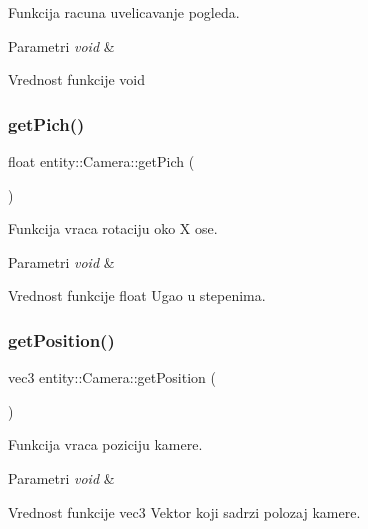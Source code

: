 Funkcija racuna uvelicavanje pogleda. 


\begin{DoxyParams}{Parametri}
{\em void} & \\
\hline
\end{DoxyParams}
\begin{DoxyReturn}{Vrednost funkcije}
void 
\end{DoxyReturn}
\mbox{\label{classentity_1_1Camera_a502da7b4da0782356f7bf75e99e4419c}} 
\subsubsection{\texorpdfstring{get\+Pich()}{getPich()}}
{\footnotesize\ttfamily float entity\+::\+Camera\+::get\+Pich (\begin{DoxyParamCaption}{ }\end{DoxyParamCaption})}



Funkcija vraca rotaciju oko X ose. 


\begin{DoxyParams}{Parametri}
{\em void} & \\
\hline
\end{DoxyParams}
\begin{DoxyReturn}{Vrednost funkcije}
float Ugao u stepenima. 
\end{DoxyReturn}
\mbox{\label{classentity_1_1Camera_a2c6b67d27b4012631306c2c2c5a3691c}} 
\subsubsection{\texorpdfstring{get\+Position()}{getPosition()}}
{\footnotesize\ttfamily vec3 entity\+::\+Camera\+::get\+Position (\begin{DoxyParamCaption}{ }\end{DoxyParamCaption})}



Funkcija vraca poziciju kamere. 


\begin{DoxyParams}{Parametri}
{\em void} & \\
\hline
\end{DoxyParams}
\begin{DoxyReturn}{Vrednost funkcije}
vec3 Vektor koji sadrzi polozaj kamere. 
\end{DoxyReturn}
\mbox{\label{classentity_1_1Camera_a9d9288cb98d6bf73c2ac749274ae3f03}} 
